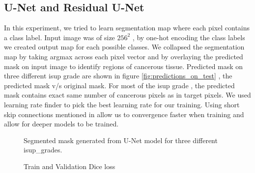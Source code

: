 \documentclass[10pt,twocolumn,letterpaper]{article}
\begin{document}
\subsection{U-Net and Residual U-Net}
 In this experiment, we tried to learn segmentation map where each pixel contains a class label. Input image was of size $256^2$ , by one-hot encoding the class labels we created output map for each possible classes. We collapsed the segmentation map by taking argmax across each pixel vector and by overlaying the predicted mask on input image to identify regions of cancerous tissue. Predicted mask on three different isup grade are shown in figure \ref{fig:predictions_on_test} , the predicted mask v/s original mask. For most of the isup grade  , the predicted mask contains exact same number of cancerous pixels as in target pixels. We used learning rate finder \cite{DBLP:journals/corr/Smith15a} to pick the best learning rate for our training. Using short skip connections mentioned in \cite{Amartya} allow us to convergence faster when training and allow for deeper models to be trained.
\begin{figure}[t]
\begin{center}
\end{center}
  \caption{Segmented mask generated from U-Net model for three different isup\_grades.}
\label{fig:predictions_on_test}
\label{fig:onecol}
\end{figure}

\begin{figure}[t]
\begin{center}
\end{center}
  \caption{Train and Validation Dice loss}
\label{fig:long}
\label{fig:onecol}
\end{figure}
\end{document}
